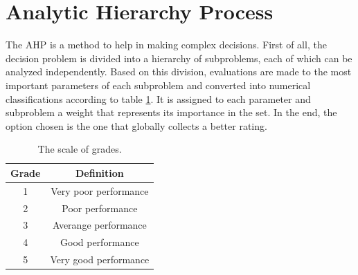 \documentclass[english,fira]{ist-report}
\begin{document}
\section{Analytic Hierarchy Process}

The AHP is a method to help in making complex decisions. First of all, the decision problem is divided into a hierarchy of subproblems, each of which can be analyzed independently. Based on this division, evaluations are made to the most important parameters of each subproblem and converted into numerical classifications according to table \ref{tab:grades_scale}. It is assigned to each parameter and subproblem a weight that represents its importance in the set. In the end, the option chosen is the one that globally collects a better rating.

\begin{table}[ht]
	\centering
	\begin{tabular}{c|c}\toprule
		Grade	& Definition			\\
		\midrule
		1		& Very poor performance	\\
		2		& Poor performance		\\
		3		& Averange performance	\\
		4		& Good performance		\\
		5		& Very good performance	\\
		\bottomrule
	\end{tabular}
	\caption{The scale of grades.}
	\label{tab:grades_scale}
\end{table}
\end{document}
